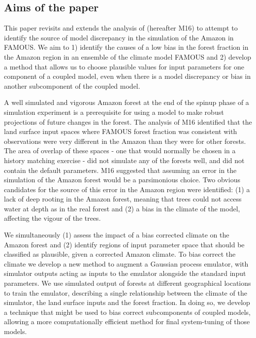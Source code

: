 \documentclass[gmd, manuscript]{copernicus}
\begin{document}
\subsection{Aims of the paper}

This paper revisits and extends the analysis of \cite{mcneall2016impact} (hereafter M16) to attempt to identify the source of model discrepancy in the simulation of the Amazon in FAMOUS. We aim to 1) identify the causes of a low bias in the forest fraction in the Amazon region in an ensemble of the climate model FAMOUS and 2) develop a method that allows us to choose plausible values for input parameters for one component of a coupled model, even when there is a model discrepancy or bias in another subcomponent of the coupled model.

A well simulated and vigorous Amazon forest at the end of the spinup phase of a simulation experiment is a prerequisite for using a model to make robust projections of future changes in the forest. The analysis of M16 identified that the land surface input spaces where FAMOUS forest fraction was consistent with observations were very different in the Amazon than they were for other forests. The area of overlap of these spaces - one that would normally be chosen in a history matching exercise - did not simulate any of the forests well, and did not contain the default parameters. M16 suggested that assuming an error in the simulation of the Amazon forest would be a parsimonious choice. Two obvious candidates for the source of this error in the Amazon region were identified: (1) a lack of deep rooting in the Amazon forest, meaning that trees could not access water at depth as in the real forest and (2) a bias in the climate of the model, affecting the vigour of the trees.

We simultaneously (1) assess the impact of a bias corrected climate on the Amazon forest and (2) identify regions of input parameter space that should be classified as plausible, given a corrected Amazon climate. To bias correct the climate we develop a new method to augment a Gaussian process emulator, with simulator outputs acting as inputs to the emulator alongside the standard input parameters.  We use simulated output of forests at different geographical locations to train the emulator, describing a single relationship between the climate of the simulator, the land surface inputs and the forest fraction. In doing so, we develop a technique that might be used to bias correct subcomponents of coupled models, allowing a more computationally efficient method for final system-tuning of those models. 
\end{document}
